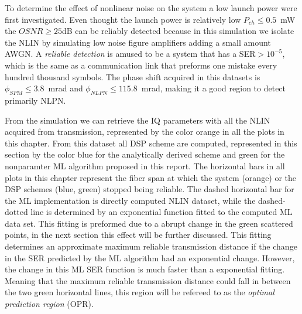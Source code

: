 To determine the effect of nonlinear noise on the system a low launch power were first investigated. Even thought the launch power is relatively low $P_{ch}\le 0.5$~mW the $OSNR\ge 25 $dB can be reliably detected because in this simulation we isolate the NLIN by simulating low noise figure amplifiers adding a small amount AWGN. A \textit{reliable detection} is amused to be a system that has a SER$>10^{-5}$, which is the same as a communication link that preforms one mistake every hundred thousand symbols. The phase shift acquired in this datasets is $\phi_{SPM}\le 3.8$~mrad and $\phi_{NLPN}\le 115.8$~mrad, making it a good region to detect primarily NLPN. 


 From the simulation we can retrieve the IQ parameters  with all the NLIN acquired from transmission, represented by the color orange in all the plots in this chapter. From this dataset all DSP scheme are computed, represented in this section by the color blue for the analytically derived scheme and green for the nonparamter ML algorithm proposed in this report. The horizontal bars in all plots in this chapter represent the fiber span at which the system (orange) or the DSP schemes (blue, green) stopped being reliable. The dashed horizontal bar for the ML implementation is directly computed NLIN dataset, while the dashed-dotted line is determined by an exponential function fitted to the computed ML data set. This fitting is preformed due to a abrupt change in the green scattered points, in the next section this effect will be further discussed. This fitting determines an approximate maximum reliable transmission distance if the change in the SER predicted by the ML algorithm had an exponential change. However, the change in this ML SER function is much faster than a exponential fitting. Meaning that the maximum reliable transmission distance could fall in between the two green horizontal lines, this region will be refereed to as the \textit{optimal prediction region}  (OPR). 
 
